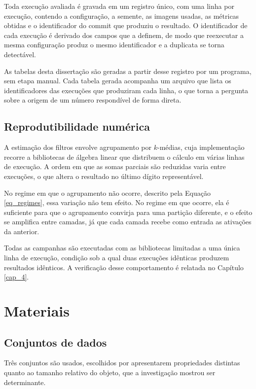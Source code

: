 Toda execução avaliada é gravada em um registro único, com uma linha por execução, contendo a configuração, a semente, as imagens usadas, as métricas obtidas e o identificador do commit que produziu o resultado. O identificador de cada execução é derivado dos campos que a definem, de modo que reexecutar a mesma configuração produz o mesmo identificador e a duplicata se torna detectável.

As tabelas desta dissertação são geradas a partir desse registro por um programa, sem etapa manual. Cada tabela gerada acompanha um arquivo que lista os identificadores das execuções que produziram cada linha, o que torna a pergunta sobre a origem de um número respondível de forma direta.

\subsection{Reprodutibilidade numérica}

A estimação dos filtros envolve agrupamento por $k$-médias, cuja implementação recorre a bibliotecas de álgebra linear que distribuem o cálculo em várias linhas de execução. A ordem em que as somas parciais são reduzidas varia entre execuções, o que altera o resultado no último dígito representável.

No regime em que o agrupamento não ocorre, descrito pela Equação \ref{eq_regimes}, essa variação não tem efeito. No regime em que ocorre, ela é suficiente para que o agrupamento convirja para uma partição diferente, e o efeito se amplifica entre camadas, já que cada camada recebe como entrada as ativações da anterior.

Todas as campanhas são executadas com as bibliotecas limitadas a uma única linha de execução, condição sob a qual duas execuções idênticas produzem resultados idênticos. A verificação desse comportamento é relatada no Capítulo \ref{cap_4}.

\section{Materiais}

\subsection{Conjuntos de dados}

Três conjuntos são usados, escolhidos por apresentarem propriedades distintas quanto ao tamanho relativo do objeto, que a investigação mostrou ser determinante.

